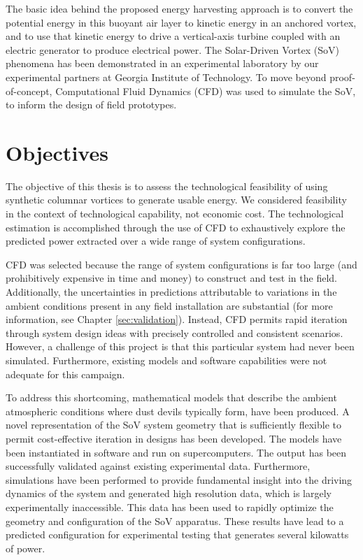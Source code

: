 The basic idea behind the proposed energy harvesting approach is to
convert the potential energy in this buoyant air layer to kinetic energy
in an anchored vortex, and to use that kinetic energy to drive a
vertical-axis turbine coupled with an electric generator to
produce electrical power. 
The Solar-Driven Vortex (SoV) phenomena has been demonstrated in
an experimental laboratory by our experimental partners at Georgia
Institute of Technology\cite{mark-thesis}. To move beyond
proof-of-concept, Computational Fluid Dynamics (CFD) was used to
simulate the SoV, to inform the design of field prototypes. 


\section{Objectives}

The objective of this thesis is to assess the technological feasibility
of using synthetic columnar vortices to generate usable energy. 
We considered feasibility in the context of technological capability,
not economic cost. The technological estimation is accomplished through
the use of CFD to exhaustively explore the predicted power extracted
over a wide range of system configurations. 

CFD was selected because the range of system configurations is far too
large (and prohibitively expensive in time and money) to construct and
test in the field. Additionally, the uncertainties in predictions
attributable to variations in the ambient conditions present in any field
installation are substantial (for more information, see Chapter
\ref{sec:validation}). Instead, CFD permits rapid iteration
through system design ideas with precisely controlled and consistent
scenarios. However, a challenge of this project is that this particular
system had never been simulated. Furthermore, existing models and
software capabilities were not adequate for this campaign.

To address this shortcoming, mathematical models that describe the ambient 
atmospheric 
conditions where dust devils typically form, have been produced. A novel 
representation of the SoV system geometry that is sufficiently flexible
to permit cost-effective iteration in designs has been developed. The
models have been instantiated in software and run on supercomputers. 
The output has been successfully validated against existing experimental
data. Furthermore, simulations have been performed to provide
fundamental insight into the driving dynamics of the system and
generated high resolution data, which is largely experimentally
inaccessible. This data has been used to rapidly optimize the geometry
and configuration of the SoV apparatus. These results have lead to a 
predicted configuration for experimental testing that generates several
kilowatts of power. 

